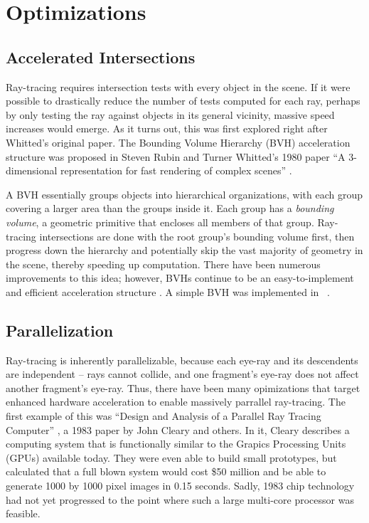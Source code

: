 \section{Optimizations}

\subsection{Accelerated Intersections}

Ray-tracing requires intersection tests with every object in the scene.
If it were possible to drastically reduce the number of tests computed for each ray, perhaps by only testing the ray against objects in its general vicinity, massive speed increases would emerge.
As it turns out, this was first explored right after Whitted's original paper.
The Bounding Volume Hierarchy (BVH) acceleration structure was proposed in Steven Rubin and Turner Whitted's 1980 paper ``A 3-dimensional representation for fast rendering of complex scenes'' \cite{rubin1980}.

A BVH essentially groups objects into hierarchical organizations, with each group covering a larger area than the groups inside it.
Each group has a {\it bounding volume}, a geometric primitive that encloses all members of that group.
Ray-tracing intersections are done with the root group's bounding volume first, then progress down the hierarchy and potentially skip the vast majority of geometry in the scene, thereby speeding up computation.
There have been numerous improvements to this idea; however, BVHs continue to be an easy-to-implement and efficient acceleration structure \cite{prunier2017bvh}.
A simple BVH was implemented in \name\ .

\subsection{Parallelization}

Ray-tracing is inherently parallelizable, because each eye-ray and its descendents are independent -- rays cannot collide, and one fragment's eye-ray does not affect another fragment's eye-ray.
Thus, there have been many opimizations that target enhanced hardware acceleration to enable massively parrallel ray-tracing.
The first example of this was ``Design and Analysis of a Parallel Ray Tracing Computer'' \cite{cleary1983design}, a 1983 paper by John Cleary and others.
In it, Cleary describes a computing system that is functionally similar to the Grapics Processing Units (GPUs) available today.
They were even able to build small prototypes, but calculated that a full blown system would cost \$50 million and be able to generate 1000 by 1000 pixel images in 0.15 seconds.
Sadly, 1983 chip technology had not yet progressed to the point where such a large multi-core processor was feasible.

